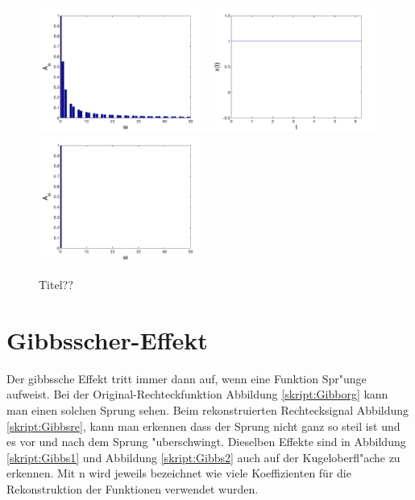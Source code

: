 \begin{refsection}
\begin{figure}
\includegraphics[width=0.49\textwidth]{kugel/Dkonstant/Rechteck3_2.pdf}
\includegraphics[width=0.49\textwidth]{kugel/Dkonstant/Rechteck4_1.pdf}
\includegraphics[width=0.49\textwidth]{kugel/Dkonstant/Rechteck4_2.pdf}
\caption{Titel??
\label{skript:Dirac2}}
\end{figure}

\section{Gibbsscher-Effekt} 
Der gibbssche Effekt tritt immer dann auf, wenn eine Funktion Spr"unge aufweist. Bei der Original-Rechteckfunktion Abbildung \ref{skript:Gibborg} kann man einen solchen Sprung sehen. Beim rekonstruierten Rechtecksignal Abbildung \ref{skript:Gibbsre},  kann man erkennen dass der Sprung nicht ganz so steil ist und es vor und nach dem Sprung "uberschwingt. Dieselben Effekte sind in Abbildung \ref{skript:Gibbs1} und Abbildung \ref{skript:Gibbs2} auch auf der Kugeloberfl"ache zu erkennen. Mit n wird jeweils bezeichnet wie viele Koeffizienten für die Rekonstruktion der Funktionen verwendet wurden.



\end{refsection}
